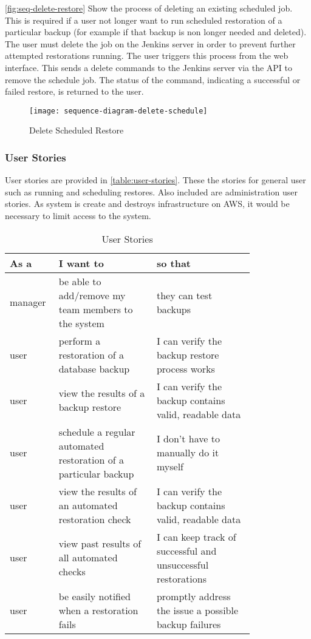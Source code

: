 		\noindent \autoref{fig:seq-delete-restore} Show the process of deleting an existing scheduled job. This is required if a user not longer want to run scheduled restoration of a particular backup (for example if that backup is non longer needed and deleted). The user must delete the job on the Jenkins server in order to prevent further attempted restorations running. The user triggers this process from the web interface. This sends a delete commands to the Jenkins server via the API to remove the schedule job. The status of the command, indicating a successful or failed restore, is returned to the user. 
		\begin{figure}[H]
			\setlength{\belowcaptionskip}{15pt plus 3pt minus 2pt}
			\caption{Delete Scheduled Restore}
			\centering
			\texttt{[image: sequence-diagram-delete-schedule]}
			\label{fig:seq-delete-restore}
		\end{figure}
	
	\subsubsection{User Stories}
		User stories are provided in \autoref{table:user-stories}. These the stories for general user such as running and scheduling restores. Also included are administration user stories. As system is create and destroys infrastructure on AWS, it would be necessary to limit access to the system.
		
		\begin{table}[H]
			\setlength{\belowcaptionskip}{15pt plus 3pt minus 2pt}
			\caption{User Stories}
			\begin{tabular}{|l|p{0.4\linewidth}|p{0.4\linewidth}|} \hline
				\textbf{As a} & \textbf{I want to} & \textbf{so that} \\ \hline
				manager & be able to add/remove my team members to the system & they can test backups \\ \hline
				user & perform a restoration of a database backup & I can verify the backup restore process works \\ \hline
				user & view the results of a backup restore & I can verify the backup contains valid, readable data \\ \hline
				user & schedule a regular automated restoration of a particular backup & I don't have to manually do it myself \\ \hline
				user & view the results of an automated restoration check & I can verify the backup contains valid, readable data \\ \hline
				user & view past results of all automated checks & I can keep track of successful and unsuccessful restorations \\ \hline
				user & be easily notified when a restoration fails & promptly address the issue a possible backup failures \\  \hline
			\end{tabular}
			\label{table:user-stories}
		\end{table}
		
